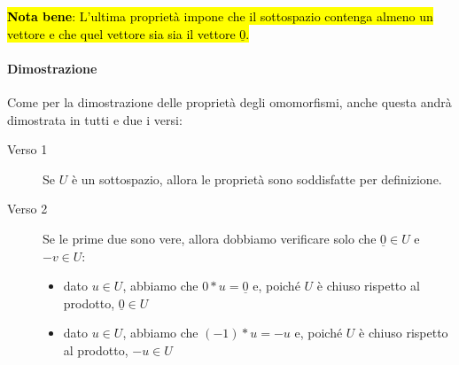 \hl{ \textbf{Nota bene}: L'ultima proprietà impone che il sottospazio contenga almeno
un vettore e che quel vettore sia sia il vettore $\underline{0}$.}

\paragraph{Dimostrazione} Come per la dimostrazione delle proprietà degli omomorfismi,
anche questa andrà dimostrata in tutti e due i versi:
\begin{description}
    \item[Verso 1] Se $U$ è un sottospazio, allora le proprietà sono soddisfatte
        per definizione.
    \item[Verso 2] Se le prime due sono vere, allora dobbiamo verificare solo che
        $\underline{0} \in U$ e $-v \in U$:
        \begin{itemize}
            \item dato $u \in U$, abbiamo che $0*u = \underline{0}$ e, poiché
                $U$ è chiuso rispetto al prodotto, $\underline{0} \in U$
            \item dato $u \in U$, abbiamo che $(-1)*u = -u$ e, poiché $U$ è
                chiuso rispetto al prodotto, $-u \in U$
        \end{itemize}
\end{description}
